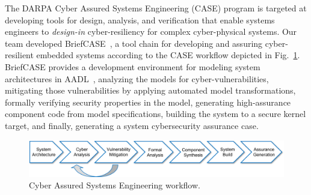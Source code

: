 

%

The DARPA Cyber Assured Systems Engineering (CASE) program is targeted at developing tools for design, analysis, and verification that enable systems engineers to \textit{design-in} cyber-resiliency for complex cyber-physical systems. 
%
Our team developed BriefCASE~\cite{case-at-scale}, a tool chain for developing and assuring cyber-resilient embedded systems according to the CASE workflow depicted in Fig.~\ref{fig:workflow}. BriefCASE provides a development environment for modeling system architectures in AADL~\cite{feiler-aadl}, analyzing the models for cyber-vulnerabilities, mitigating those vulnerabilities by applying automated model transformations, formally verifying security properties in the model, generating high-assurance component code from model specifications, building the system to a secure kernel target, and finally, generating a system cybersecurity assurance case.  

\begin{figure}[h] 
	\centering 
	\includegraphics[width=\textwidth]{figs/workflow.png}
	\caption{Cyber Assured Systems Engineering workflow.}
	\label{fig:workflow} 
\end{figure}


